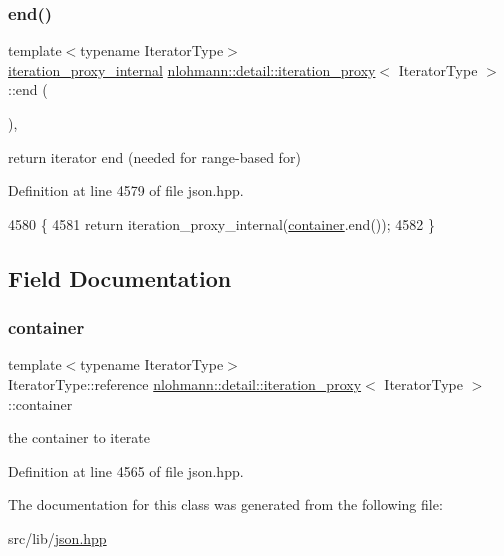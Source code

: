 \subsubsection{\texorpdfstring{end()}{end()}}
{\footnotesize\ttfamily template$<$typename Iterator\+Type$>$ \\
\hyperlink{classnlohmann_1_1detail_1_1iteration__proxy_1_1iteration__proxy__internal}{iteration\+\_\+proxy\+\_\+internal} \hyperlink{classnlohmann_1_1detail_1_1iteration__proxy}{nlohmann\+::detail\+::iteration\+\_\+proxy}$<$ Iterator\+Type $>$\+::end (\begin{DoxyParamCaption}{ }\end{DoxyParamCaption})\hspace{0.3cm}{\ttfamily [inline]}, {\ttfamily [noexcept]}}



return iterator end (needed for range-\/based for) 



Definition at line 4579 of file json.\+hpp.


\begin{DoxyCode}
4580     \{
4581         \textcolor{keywordflow}{return} iteration\_proxy\_internal(\hyperlink{classnlohmann_1_1detail_1_1iteration__proxy_a88c0532ba4a5de1d527b18053b24fd19}{container}.end());
4582     \}
\end{DoxyCode}


\subsection{Field Documentation}
\mbox{\label{classnlohmann_1_1detail_1_1iteration__proxy_a88c0532ba4a5de1d527b18053b24fd19}} 
\subsubsection{\texorpdfstring{container}{container}}
{\footnotesize\ttfamily template$<$typename Iterator\+Type$>$ \\
Iterator\+Type\+::reference \hyperlink{classnlohmann_1_1detail_1_1iteration__proxy}{nlohmann\+::detail\+::iteration\+\_\+proxy}$<$ Iterator\+Type $>$\+::container\hspace{0.3cm}{\ttfamily [private]}}



the container to iterate 



Definition at line 4565 of file json.\+hpp.



The documentation for this class was generated from the following file\+:\begin{DoxyCompactItemize}
\item 
src/lib/\hyperlink{json_8hpp}{json.\+hpp}\end{DoxyCompactItemize}
